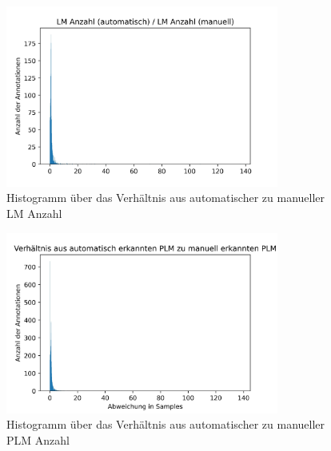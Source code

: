 \begin{figure}[!ht]%
	\begin{center}
	\includegraphics[width=0.80\textwidth]{./Bilder/LMcountrel.jpg}
	\end{center}
	\caption{Histogramm über das Verhältnis aus automatischer zu manueller LM Anzahl}%
	\label{fig:AASMKrit}%
\end{figure}


\begin{figure}[!ht]%
	\begin{center}
	\includegraphics[width=0.80\textwidth]{./Bilder/VerhÃ¤ltnis aus automatisch erkannten PLM zu manuell erkannten PLM.jpg}
	\end{center}
	\caption{Histogramm über das Verhältnis aus automatischer zu manueller PLM Anzahl}%
	\label{fig:AASMKrit}%
\end{figure}

